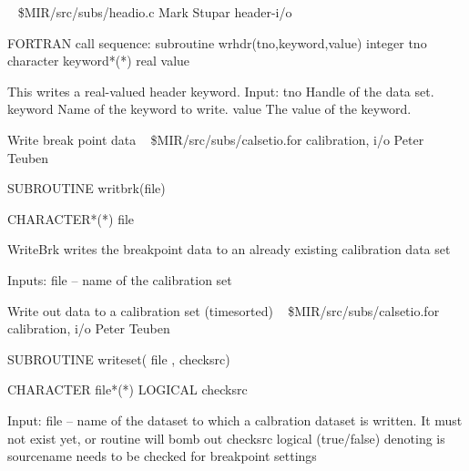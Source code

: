 \newline \ 
\newline {} \$MIR/src/subs/headio.c
\newline {} Mark Stupar
\newline {} header-i/o
\par{\tenpoint
{\eightpoint\begintt
FORTRAN call sequence:
        subroutine wrhdr(tno,keyword,value)
        integer tno
        character keyword*(*)
        real value

  This writes a real-valued header keyword.
  Input:
    tno         Handle of the data set.
    keyword     Name of the keyword to write.
    value       The value of the keyword.                               
\endtt}
\par}
%
\noindent Write break point data
\newline \ 
\newline {} \$MIR/src/subs/calsetio.for
\newline {} calibration, i/o
\newline \abox{Responsible:} Peter Teuben
\par{\tenpoint
{\eightpoint\begintt
        SUBROUTINE writbrk(file)

        CHARACTER*(*) file

       WriteBrk writes the breakpoint data to an already existing
       calibration data set

   Inputs:
       file -- name of the calibration set
\endtt}
\par}
%
\noindent Write out data to a calibration set (timesorted)
\newline \ 
\newline {} \$MIR/src/subs/calsetio.for
\newline \abox{Keywords:} calibration, i/o
\newline {} Peter Teuben
\par{\tenpoint
{\eightpoint\begintt
        SUBROUTINE writeset( file , checksrc)

        CHARACTER file*(*)
        LOGICAL   checksrc

   Input:
       file    --  name of the dataset to which a calbration dataset
                   is written. It must not exist yet, or routine will
                   bomb out
       checksrc    logical (true/false) denoting is sourcename needs
                   to be checked for breakpoint settings
\endtt}
\par}
